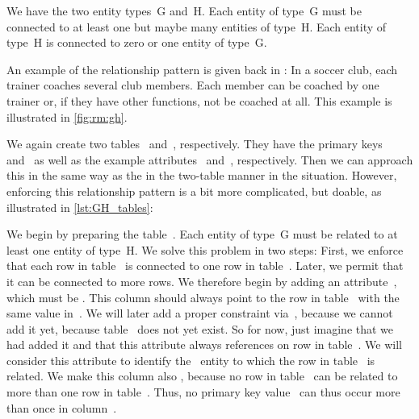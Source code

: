 %
%
%
%
%
%
%
We have the two entity types~G and~H.
Each entity of type~G must be connected to at least one but maybe many entities of type~H.
Each entity of type~H is connected to zero or one entity of type~G.

An example of the  relationship pattern is given back in :
In a soccer club, each trainer coaches several club members.
Each member can be coached by one trainer or, if they have other functions, not be coached at all.
This example is illustrated in \cref{fig:rm:gh}.

We again create two tables~ and~, respectively.
They have the primary keys~ and~ as well as the example attributes~ and~, respectively.
Then we can approach this in the same way as the in the two-table manner in the  situation.
However, enforcing this relationship pattern is a bit more complicated, but doable, as illustrated in \cref{lst:GH_tables}:

We begin by preparing the table~.
Each entity of type~G must be related to at least one entity of type~H.
We solve this problem in two steps:
First, we enforce that each row in table~ is connected to one row in table~.
Later, we permit that it can be connected to more rows.
We therefore begin by adding an attribute~, which must be .
This column should always point to the row in table~ with the same value in~.
We will later add a proper  constraint via~, because we cannot add it yet, because table~ does not yet exist.
So for now, just imagine that we had added it and that this attribute always references on row in table~.
We will consider this attribute to identify the ~entity to which the row in table~ is related.
We make this column also , because no row in table~ can be related to more than one row in table~.
Thus, no primary key value~ can thus occur more than once in column~.

